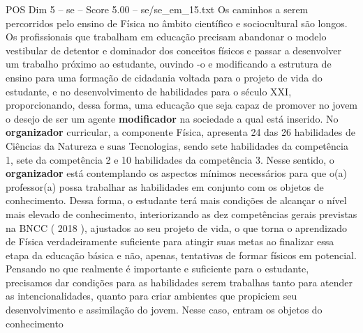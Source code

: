 \begin{textsample}{POS Dim 5 – se – Score 5.00 – se/se\_em\_15.txt}
Os caminhos a serem percorridos pelo ensino de Física no âmbito científico e sociocultural são longos.
Os profissionais que trabalham em educação precisam abandonar o modelo vestibular de detentor e dominador dos conceitos físicos e passar a desenvolver um trabalho próximo ao estudante, ouvindo -o e modificando a estrutura de ensino para uma formação de cidadania voltada para o projeto de vida do estudante, e no desenvolvimento de habilidades para o século XXI, proporcionando, dessa forma, uma educação que seja capaz de promover no jovem o desejo de ser um agente \textbf{modificador} na sociedade a qual está inserido.
No \textbf{organizador} curricular, a componente Física, apresenta 24 das 26 habilidades de Ciências da Natureza e suas Tecnologias, sendo sete habilidades da competência 1, sete da competência 2 e 10 habilidades da competência 3.
Nesse sentido, o \textbf{organizador} está contemplando os aspectos mínimos necessários para que o(a) professor(a) possa trabalhar as habilidades em conjunto com os objetos de conhecimento.
Dessa forma, o estudante terá mais condições de alcançar o nível mais elevado de conhecimento, interiorizando as dez competências gerais previstas na BNCC ( 2018 ), ajustados ao seu projeto de vida, o que torna o aprendizado de Física verdadeiramente suficiente para atingir suas metas ao finalizar essa etapa da educação básica e não, apenas, tentativas de formar físicos em potencial.
Pensando no que realmente é importante e suficiente para o estudante, precisamos dar condições para as habilidades serem trabalhas tanto para atender as intencionalidades, quanto para criar ambientes que propiciem seu desenvolvimento e assimilação do jovem.
Nesse caso, entram os objetos do conhecimento

\end{textsample}
